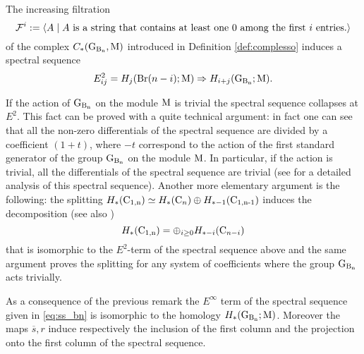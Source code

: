 The increasing filtration $$\mathcal{F}^i:= \langle  A \mid A \mbox{ is a string that contains at least one } 0 \mbox{ among the first } i \mbox{ entries.}\rangle$$ of the complex $C_*(\operatorname{G_{B_{n}}}, \mathrm{M})$ introduced in Definition \ref{def:complesso} 
induces a spectral sequence 
\begin{equation}\label{eq:ss_bn}
E_{ij}^2 = H_j(\operatorname{Br}(n-i); \mathrm{M}) \Rightarrow H_{i+j} (\operatorname{G_{B_{n}}}; \mathrm{M}).
\end{equation}
\begin{rem}\label{rem:collapsss}
If the action of $\operatorname{G_{B_{n}}}$ on the module $\mathrm{M}$ is trivial the spectral sequence collapses at $E^2$. This fact can be proved with a quite technical argument: in fact one can see that all the non-zero differentials of the spectral sequence are divided by a coefficient $(1+t)$, where $-t$ correspond to the action of the first standard generator of the group $\operatorname{G_{B_{n}}}$ on the module $\mathrm{M}$. In particular, if the action is trivial, all the differentials of the spectral sequence are trivial (see \cite{calmar} for a detailed analysis of this spectral sequence). Another more elementary argument is the following: the splitting $H_*(\operatorname{C_{1,n}}) \simeq H_*(\operatorname{C}_n) \oplus H_{*-1}(\operatorname{C_{1,n-1}})$ induces the decomposition (see also \cite{gorj}) $$
H_*(\operatorname{C_{1,n}}) = \oplus_{i \geq 0} H_{*-i} (\operatorname{C}_{n-i})
$$ that is isomorphic to the $E^2$-term of the spectral sequence above
and the same argument proves the splitting for any system of coefficients where the group $\operatorname{G_{B_{n}}}$ acts trivially.
\end{rem}
As a consequence of the previous remark the $E^\infty$ term of the spectral sequence given in \eqref{eq:ss_bn} is isomorphic to the homology $H_*(\operatorname{G_{B_{n}}}; \mathrm{M})$.
Moreover the maps $\overline{s}, r$ induce respectively the inclusion of the first column and the projection onto the first column of the spectral sequence.

